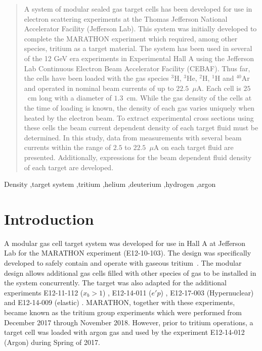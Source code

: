 \documentclass[final,5p,times,twocolumn]{elsarticle}
\begin{document}
\begin{frontmatter}
\begin{abstract}
A system of modular sealed gas target cells has been developed for use in electron scattering experiments 
at the Thomas Jefferson National Accelerator Facility (Jefferson Lab). This system was initially developed 
to complete the MARATHON experiment which required, among other species, tritium as a target material. 
The system has been used in several of the 12 GeV era experiments in Experimental Hall A using the Jefferson Lab 
Continuous Electron Beam Accelerator Facility (CEBAF). Thus far, the cells have been loaded with the gas 
species $^{3}$H, $^{3}$He, $^{2}$H, $^{1}$H and $^{40}$Ar and operated in nominal beam currents of up to $22.5$~$\mu$A.  
Each cell is $25$~cm long with a diameter of $1.3$~cm.  While the gas density of the cells at the time of loading is known, 
the density of each gas varies uniquely when heated by the electron beam. To extract experimental cross sections using 
these cells the beam current dependent density of each target fluid must be determined. In this study, data from measurements 
with several beam currents within the range of $2.5$ to $22.5$~$\mu$A on each target fluid are presented. Additionally, 
expressions for the beam dependent fluid density of each target are developed.
\end{abstract}

\begin{keyword}
Density \sep target system
\sep tritium
\sep helium 
\sep deuterium
\sep hydrogen
\sep argon
\end{keyword}
\end{frontmatter}


\section{Introduction}

A modular gas cell target system was developed for use in Hall A at Jefferson Lab for the MARATHON experiment (E12-10-103)\cite{marathon}. 
The design was specifically developed to safely contain and operate with gaseous tritium~\cite{Brajuskovic:2013ymh}. 
The modular design allows additional gas cells filled with other species of gas to be installed in the system concurrently. The target was 
also adapted for the additional experiments E12-11-112 ($x_{b}>1$) \cite{E12-11-112}, E12-14-011 ($e'p$) \cite{E12-14-011}, 
E12-17-003 (Hypernuclear) \cite{hypernuclear} and E12-14-009 (elastic) \cite{E12-14-009}.  
MARATHON, together with these experiments, became known as the tritium group experiments which were performed from December 2017 
through November 2018. However, prior to tritium operations, a target cell was loaded with argon gas and used by the 
experiment E12-14-012 (Argon) \cite{E12-14-012} during Spring of 2017. 
\end{document}
